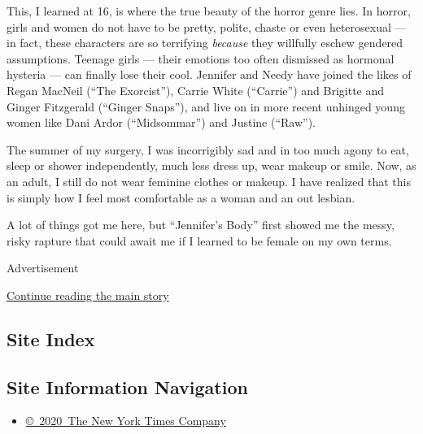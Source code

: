 This, I learned at 16, is where the true beauty of the horror genre
lies. In horror, girls and women do not have to be pretty, polite,
chaste or even heterosexual --- in fact, these characters are so
terrifying \emph{because} they willfully eschew gendered assumptions.
Teenage girls --- their emotions too often dismissed as hormonal
hysteria --- can finally lose their cool. Jennifer and Needy have joined
the likes of Regan MacNeil (``The Exorcist''), Carrie White (``Carrie'')
and Brigitte and Ginger Fitzgerald (``Ginger Snaps''), and live on in
more recent unhinged young women like Dani Ardor (``Midsommar'') and
Justine (``Raw'').

The summer of my surgery, I was incorrigibly sad and in too much agony
to eat, sleep or shower independently, much less dress up, wear makeup
or smile. Now, as an adult, I still do not wear feminine clothes or
makeup. I have realized that this is simply how I feel most comfortable
as a woman and an out lesbian.

A lot of things got me here, but ``Jennifer's Body'' first showed me the
messy, risky rapture that could await me if I learned to be female on my
own terms.

Advertisement

\protect\hyperlink{after-bottom}{Continue reading the main story}

\hypertarget{site-index}{%
\subsection{Site Index}\label{site-index}}

\hypertarget{site-information-navigation}{%
\subsection{Site Information
Navigation}\label{site-information-navigation}}

\begin{itemize}
\tightlist
\item
  \href{https://help.nytimes.com/hc/en-us/articles/115014792127-Copyright-notice}{©~2020~The
  New York Times Company}
\end{itemize}


